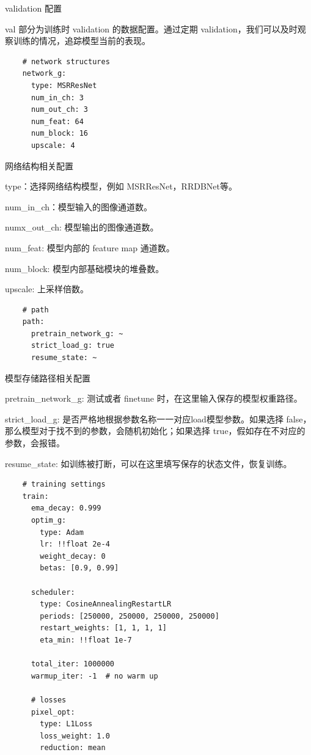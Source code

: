 \documentclass[../main.tex]{subfiles}
\begin{document}
\begin{exampleBox}[righthand ratio=0.00, sidebyside, sidebyside align=center, lower separated=false]{validation 配置}

val 部分为训练时 validation 的数据配置。通过定期 validation，我们可以及时观察训练的情况，追踪模型当前的表现。
\end{exampleBox}

    \begin{verbatim}
    # network structures
    network_g:
      type: MSRResNet
      num_in_ch: 3
      num_out_ch: 3
      num_feat: 64
      num_block: 16
      upscale: 4
    \end{verbatim}
    \begin{exampleBox}[righthand ratio=0.00, sidebyside, sidebyside align=center, lower separated=false]{网络结构相关配置}

    type：选择网络结构模型，例如 MSRResNet，RRDBNet等。

    num\_in\_ch：模型输入的图像通道数。

    numx\_out\_ch: 模型输出的图像通道数。

    num\_feat: 模型内部的 feature map 通道数。

    num\_block: 模型内部基础模块的堆叠数。

    upscale: 上采样倍数。
    \end{exampleBox}
    \begin{verbatim}
    # path
    path:
      pretrain_network_g: ~
      strict_load_g: true
      resume_state: ~
    \end{verbatim}
    \begin{exampleBox}[righthand ratio=0.00, sidebyside, sidebyside align=center, lower separated=false]{模型存储路径相关配置}

    pretrain\_network\_g: 测试或者 finetune 时，在这里输入保存的模型权重路径。

    strict\_load\_g: 是否严格地根据参数名称一一对应load模型参数。如果选择 false，那么模型对于找不到的参数，会随机初始化；如果选择 true，假如存在不对应的参数，会报错。

    resume\_state: 如训练被打断，可以在这里填写保存的状态文件，恢复训练。
    \end{exampleBox}
    \begin{verbatim}
    # training settings
    train:
      ema_decay: 0.999
      optim_g:
        type: Adam
        lr: !!float 2e-4
        weight_decay: 0
        betas: [0.9, 0.99]

      scheduler:
        type: CosineAnnealingRestartLR
        periods: [250000, 250000, 250000, 250000]
        restart_weights: [1, 1, 1, 1]
        eta_min: !!float 1e-7

      total_iter: 1000000
      warmup_iter: -1  # no warm up

      # losses
      pixel_opt:
        type: L1Loss
        loss_weight: 1.0
        reduction: mean
    \end{verbatim}
\end{document}
